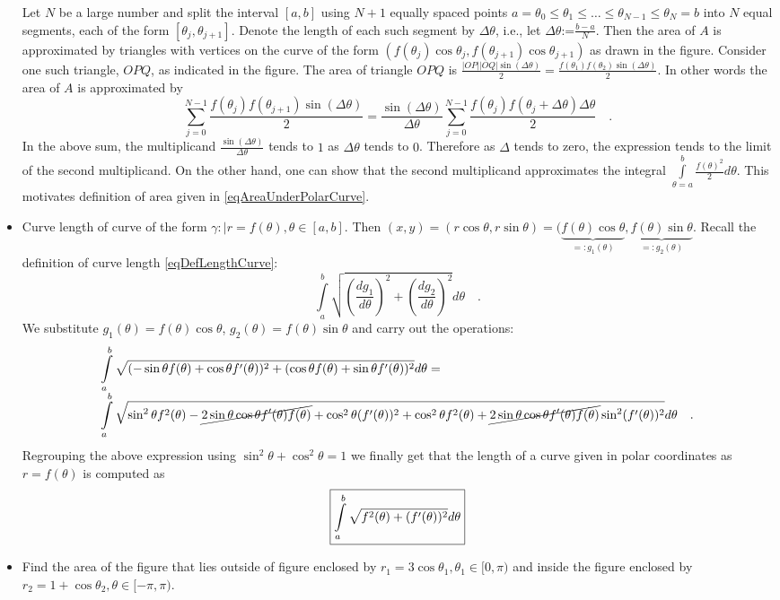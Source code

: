 \documentclass[12pt]{book}
\newcommand{\eqdef}{\textbf{:=}}
\newcommand{\importantFormula}[1]{\begin{equation} \boxed{#1} \end{equation}}
\begin{document}
\begin{itemize}
Let $N$ be a large number and split the interval $[a,b]$ using $N+1$ equally spaced points $a=\theta_0\leq\theta_1\leq\dots\leq\theta_{N-1}\leq \theta_N=b$ into $N$ equal segments, each of the form $[\theta_j,\theta_{j+1}] $. Denote the length of each such segment by $\Delta\theta$, i.e., let $\Delta\theta\eqdef \frac{b-a}{N}$. Then the area of $A$ is approximated by triangles with vertices on the curve of the form $(f(\theta_j)\cos \theta_j, f(\theta_{j+1} )\cos \theta_{j+1})$ as drawn in the figure. Consider one such triangle, $OPQ$, as indicated in the figure. The area of triangle $OPQ $ is $\frac{|OP| |OQ|\sin (\Delta\theta)}{2}= \frac{f(\theta_1)f(\theta_2)\sin (\Delta\theta)}{2} $. In other words the area of $A$ is approximated by
\[
\sum_{j=0}^{N-1} \frac{f(\theta_j)f(\theta_{j+1})\sin (\Delta\theta)}{2}= \frac{\sin(\Delta\theta)}{\Delta\theta}\sum_{j=0}^{N-1} \frac{f(\theta_j)f(\theta_{j}+\Delta\theta)\Delta\theta}{2}\quad .
\]
In the above sum, the multiplicand $\frac{\sin(\Delta\theta)}{\Delta\theta}$ tends to $1$ as $\Delta\theta$ tends to $0$. Therefore as $\Delta$ tends to zero, the expression tends to the limit of the second multiplicand. On the other hand, one can show that the second multiplicand approximates the integral $\int\limits_{\theta=a}^b \frac{f(\theta)^2}{2}d\theta$. This motivates definition of area given in \eqref{eqAreaUnderPolarCurve}.
\item Curve length of curve of the form $\gamma:|r=f(\theta),\theta\in [a,b]$. Then $(x,y)= (r\cos\theta, r\sin \theta)= (\underbrace{f(\theta)\cos\theta}_{=:g_1(\theta)}, \underbrace{ f(\theta)\sin\theta}_{=:g_2(\theta)} $. Recall the definition of curve length \eqref{eqDefLengthCurve}:
\[
\int\limits_{a}^b\sqrt{\left(\frac{dg_1}{d\theta}\right)^2+\left(\frac{dg_2}{d\theta}\right)^2}d\theta \quad.
\]
We substitute $g_1(\theta)=f(\theta)\cos\theta$, $g_2(\theta)=f(\theta)\sin\theta$ and carry out the operations:
\[
\begin{array}{l}
\displaystyle\int\limits_{a}^b\sqrt{ (-\sin\theta f(\theta) + \cos\theta f'(\theta) )^2+(\cos\theta f(\theta)+\sin \theta f'(\theta) )^2}d\theta=\\ 
\displaystyle \int \limits_{a}^b \sqrt{\sin^2\theta f^2(\theta)- \cancel{2\sin\theta\cos\theta f'(\theta)f(\theta)}+\cos^2\theta (f'(\theta))^2+ \cos^2\theta f^2(\theta)+\cancel{2\sin\theta\cos\theta f'(\theta)f(\theta)} \sin^2 (f'(\theta))^2 }d\theta\quad .
\end{array}
\]
Regrouping the above expression using $\sin^2\theta+\cos^2\theta=1$ we finally get that the length of a curve given in polar coordinates as $r=f(\theta)$ is computed as
\importantFormula{\label{eqCurveLengthPolarCoords}
\int\limits_{a}^b \sqrt{f^2(\theta)+ (f'(\theta))^2}d\theta
}
\item Find the area of the figure that lies outside of figure enclosed by $r_1=3\cos\theta_1, \theta_1\in [0,\pi)$ and inside the figure enclosed by $r_2=1+\cos\theta_2, \theta\in [-\pi,\pi)$. %


\end{itemize}
\end{document}
